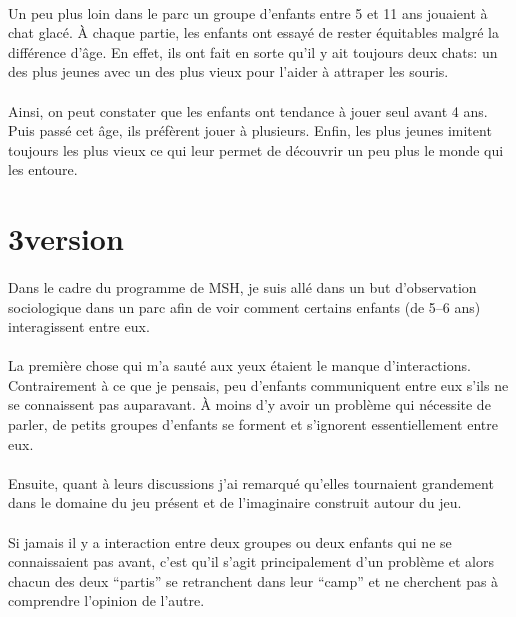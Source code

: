 \paragraph{} Un peu plus loin dans le parc un groupe d'enfants entre 5 et 11
ans jouaient à chat glacé. À chaque partie, les enfants ont essayé de rester
équitables malgré la différence d'âge. En effet, ils ont fait en sorte qu'il y
ait toujours deux chats: un des plus jeunes avec un des plus vieux pour l'aider
à attraper les souris.

\paragraph{} Ainsi, on peut constater que les enfants ont tendance à jouer seul
avant 4 ans. Puis passé cet âge, ils préfèrent jouer à plusieurs. Enfin, les
plus jeunes imitent toujours les plus vieux ce qui leur permet de découvrir un
peu plus le monde qui les entoure.

\section{3\ieme version}

\paragraph{} Dans le cadre du programme de MSH, je suis allé dans un but
d'observation sociologique dans un parc afin de voir comment certains enfants
(de 5--6 ans) interagissent entre eux.

\paragraph{} La première chose qui m'a sauté aux yeux étaient le manque
d'interactions. Contrairement à ce que je pensais, peu d'enfants communiquent
entre eux s'ils ne se connaissent pas auparavant. À moins d'y avoir un problème
qui nécessite de parler, de petits groupes d'enfants se forment et s'ignorent
essentiellement entre eux.

\paragraph{} Ensuite, quant à leurs discussions j'ai remarqué qu'elles
tournaient grandement dans le domaine du jeu présent et de l'imaginaire
construit autour du jeu.

\paragraph{} Si jamais il y a interaction entre deux groupes ou deux enfants
qui ne se connaissaient pas avant, c'est qu'il s'agit principalement d'un
problème et alors chacun des deux ``partis'' se retranchent dans leur ``camp''
et ne cherchent pas à comprendre l'opinion de l'autre.

